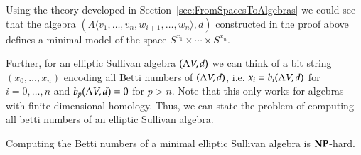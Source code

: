  \begin{Remark}
  Using the theory developed in Section~\ref{sec:FromSpacesToAlgebras} we could see 
  that the algebra $ (\Lambda \langle v_1, \ldots, v_n,w_{i+1}, \ldots, w_n \rangle , d)$
  constructed in the proof above defines
  a minimal model of the space $S^{x_1} \times \cdots \times S^{x_n}$.
 \end{Remark}

 
 Further, for an elliptic Sullivan algebra $(\Lambda V,d)$ we can think of a bit string $(x_0, \ldots, x_n)$ encoding all 
 Betti numbers of $(\Lambda V,d)$, i.e. $x_i = b_i (\Lambda V,d)$ for $i = 0,\ldots, n$ and $b_p (\Lambda V,d) = 0$ for $p > n$.
 Note that this only works for algebras with finite dimensional homology. Thus, we can state the problem of computing all
 betti numbers of an elliptic Sullivan algebra.
  
  
 
 \begin{Corollary}
\label{thm:AlgebrasComputingBettiNumbers}
  Computing the Betti numbers of a minimal elliptic Sullivan algebra is $\mathbf{NP}$-hard.
 \end{Corollary}
